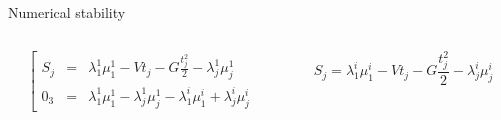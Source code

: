 \documentclass{beamer}
\begin{document}
\begin{frame}[noframenumbering]{Numerical stability}

  \begin{columns}
    \begin{column}{.5\textwidth}
    {\small
    \[
    \left[
      \begin{array}{lcl}
        S_j &=& \lambda_1^1\mu_1^1 - V t_j - G \frac{t_j^2}{2} - \lambda^1_j \mu^1_j\\
        0_3 &=& \lambda_1^1\mu_1^1 - \lambda_j^1\mu_j^1 - \lambda_1^i\mu_1^i + \lambda^i_j \mu^i_j
      \end{array}
      \right.
      \]
    }
    \end{column}
    \vrule{}
    \begin{column}{.5\textwidth}
    {\small
    \[
    S_j = \lambda_1^i\mu_1^i - V t_j - G \frac{t_j^2}{2} - \lambda^i_j \mu^i_j
    \]
    }
    \end{column}
  \end{columns}

  \begin{figure}[h!]
    \centering
    \resizebox{0.5\textwidth}{!}{}
  \end{figure}

\end{frame}



\end{document}
